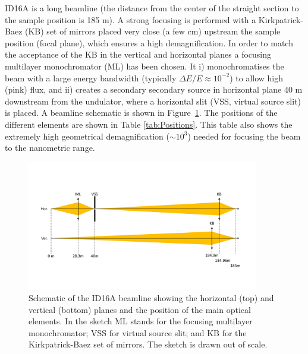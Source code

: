 \documentclass{iucr}              %
\begin{document}
ID16A is a long beamline (the distance from the center of the straight section to the sample position is 185 m). A strong focusing is performed with a Kirkpatrick-Baez (KB) set of mirrors placed very close (a few cm) upstream the sample position (focal plane), which ensures a high demagnification. In order to match the acceptance of the KB in the vertical and horizontal planes a focusing multilayer monochromator (ML) has
been chosen. It i) monochromatises the beam with a large energy bandwidth (typically $\Delta E/E \approx 10^{-2}$) to allow high (pink) flux, 
and ii) creates a secondary secondary source in horizontal plane 40 m downstream from the undulator, where a horizontal slit (VSS, virtual source slit) is placed. A beamline schematic is shown in Figure~\ref{fig:ID16A}. The positions of the different elements are shown in Table \ref{tab:Positions}. This table also shows the extremely high geometrical demagnification ($\sim 10^3$) needed for focusing the beam to the nanometric range.  

\begin{figure}\label{fig:ID16A}
    \centering
    \includegraphics[width=0.9\textwidth,clip=true,trim=50 85 50 85]{GRAPHICS/ID16A.pdf}
    \caption{Schematic of the ID16A beamline showing the horizontal (top) and vertical (bottom) planes and the position of the main optical elements. In the sketch ML stands for the focusing multilayer monochromator; VSS for virtual source slit; and KB for the Kirkpatrick-Baez set of mirrors. The sketch is drawn out of scale.}
\end{figure}
\end{document}

